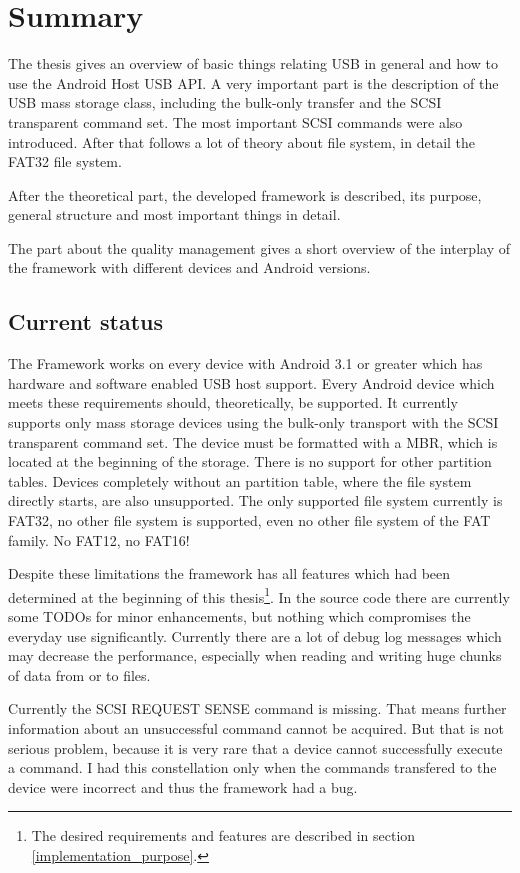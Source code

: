\chapter{Summary}

The thesis gives an overview of basic things relating USB in general and how to use the Android Host USB API. A very important part is the description of the USB mass storage class, including the bulk-only transfer and the SCSI transparent command set. The most important SCSI commands were also introduced. After that follows a lot of theory about file system, in detail the FAT32 file system.

After the theoretical part, the developed framework is described, its purpose, general structure and most important things in detail.

The part about the quality management gives a short overview of the interplay of the framework with different devices and Android versions.

\section{Current status}

The Framework works on every device with Android 3.1 or greater which has hardware and software enabled USB host support. Every Android device which meets these requirements should, theoretically, be supported. It currently supports only mass storage devices using the bulk-only transport with the SCSI transparent command set. The device must be formatted with a MBR, which is located at the beginning of the storage. There is no support for other partition tables. Devices completely without an partition table, where the file system directly starts, are also unsupported. The only supported file system currently is FAT32, no other file system is supported, even no other file system of the FAT family. No FAT12, no FAT16!

Despite these limitations the framework has all features which had been determined at the beginning of this thesis\footnote{The desired requirements and features are described in section \ref{implementation_purpose}.}. In the source code there are currently some TODOs for minor enhancements, but nothing which compromises the everyday use significantly. Currently there are a lot of debug log messages which may decrease the performance, especially when reading and writing huge chunks of data from or to files.

Currently the SCSI REQUEST SENSE command is missing. That means further information about an unsuccessful command cannot be acquired. But that is not serious problem, because it is very rare that a device cannot successfully execute a command. I had this constellation only when the commands transfered to the device were incorrect and thus the framework had a bug.

